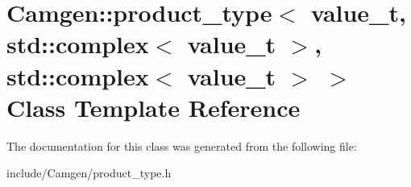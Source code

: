 \hypertarget{a00441}{}\section{Camgen\+:\+:product\+\_\+type$<$ value\+\_\+t, std\+:\+:complex$<$ value\+\_\+t $>$, std\+:\+:complex$<$ value\+\_\+t $>$ $>$ Class Template Reference}
\label{a00441}


The documentation for this class was generated from the following file\+:\begin{DoxyCompactItemize}
\item 
include/\+Camgen/product\+\_\+type.\+h\end{DoxyCompactItemize}
